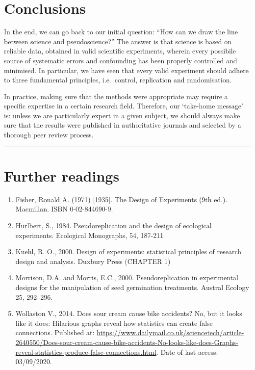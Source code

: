 \documentclass[a4paper,12pt,oneside]{book}
\providecommand{\tightlist}{%
  \setlength{\itemsep}{0pt}\setlength{\parskip}{0pt}}
\begin{document}
\hypertarget{conclusions}{%
\section{Conclusions}\label{conclusions}}

In the end, we can go back to our initial question: ``How can we draw the line between science and pseudoscience?'' The answer is that science is based on reliable data, obtained in valid scientific experiments, wherein every possibile source of systematic errors and confounding has been properly controlled and minimised. In particular, we have seen that every valid experiment should adhere to three fundamental principles, i.e.~control, replication and randomisation.

In practice, making sure that the methods were appropriate may require a specific expertise in a certain research field. Therefore, our `take-home message' is: unless we are particularly expert in a given subject, we should always make sure that the results were published in authoritative journals and selected by a thorough peer review process.

\begin{center}\rule{0.5\linewidth}{0.5pt}\end{center}

\hypertarget{further-readings}{%
\section{Further readings}\label{further-readings}}

\begin{enumerate}
\def\labelenumi{\arabic{enumi}.}
\tightlist
\item
  Fisher, Ronald A. (1971) {[}1935{]}. The Design of Experiments (9th ed.). Macmillan. ISBN 0-02-844690-9.
\item
  Hurlbert, S., 1984. Pseudoreplication and the design of ecological experiments. Ecological Monographs, 54, 187-211
\item
  Kuehl, R. O., 2000. Design of experiments: statistical principles of research design and analysis. Duxbury Press (CHAPTER 1)
\item
  Morrison, D.A. and Morris, E.C., 2000. Pseudoreplication in experimental designs for the manipulation of seed germination treatments. Austral Ecology 25, 292--296.
\item
  Wollaston V., 2014. Does sour cream cause bike accidents? No, but it looks like it does: Hilarious graphs reveal how statistics can create false connections. Published at: \url{https://www.dailymail.co.uk/sciencetech/article-2640550/Does-sour-cream-cause-bike-accidents-No-looks-like-does-Graphs-reveal-statistics-produce-false-connections.html}. Date of last access: 03/09/2020.
\end{enumerate}
\end{document}
